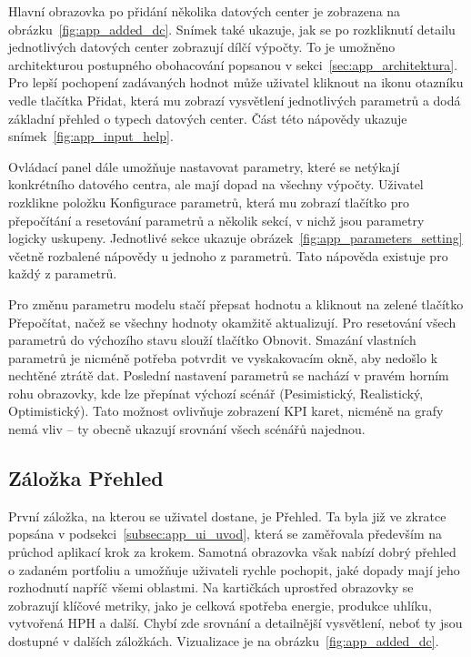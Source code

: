 Hlavní obrazovka po přidání několika datových center je zobrazena na obrázku~\ref{fig:app_added_dc}. Snímek také ukazuje, jak se po rozkliknutí detailu jednotlivých datových center zobrazují dílčí výpočty. To je umožněno architekturou postupného obohacování popsanou v sekci~\ref{sec:app_architektura}. Pro lepší pochopení zadávaných hodnot může uživatel kliknout na ikonu otazníku vedle tlačítka Přidat, která mu zobrazí vysvětlení jednotlivých parametrů a dodá základní přehled o typech datových center. Část této nápovědy ukazuje snímek~\ref{fig:app_input_help}.

Ovládací panel dále umožňuje nastavovat parametry, které se netýkají konkrétního datového centra, ale mají dopad na všechny výpočty. Uživatel rozklikne položku Konfigurace parametrů, která mu zobrazí tlačítko pro přepočítání a resetování parametrů a několik sekcí, v nichž jsou parametry logicky uskupeny. Jednotlivé sekce ukazuje obrázek~\ref{fig:app_parameters_setting} včetně rozbalené nápovědy u jednoho z parametrů. Tato nápověda existuje pro každý z parametrů.

Pro změnu parametru modelu stačí přepsat hodnotu a kliknout na zelené tlačítko Přepočítat, načež se všechny hodnoty okamžitě aktualizují. Pro resetování všech parametrů do výchozího stavu slouží tlačítko Obnovit. Smazání vlastních parametrů je nicméně potřeba potvrdit ve vyskakovacím okně, aby nedošlo k nechtěné ztrátě dat. Poslední nastavení parametrů se nachází v pravém horním rohu obrazovky, kde lze přepínat výchozí scénář (Pesimistický, Realistický, Optimistický). Tato možnost ovlivňuje zobrazení KPI karet, nicméně na grafy nemá vliv -- ty obecně ukazují srovnání všech scénářů najednou.

\subsection{Záložka Přehled}
\label{subsec:app_ui_prehled}

První záložka, na kterou se uživatel dostane, je Přehled. Ta byla již ve zkratce popsána v podsekci~\ref{subsec:app_ui_uvod}, která se zaměřovala především na průchod aplikací krok za krokem. Samotná obrazovka však nabízí dobrý přehled o zadaném portfoliu a umožňuje uživateli rychle pochopit, jaké dopady mají jeho rozhodnutí napříč všemi oblastmi. Na kartičkách uprostřed obrazovky se zobrazují klíčové metriky, jako je celková spotřeba energie, produkce uhlíku, vytvořená HPH a další. Chybí zde srovnání a detailnější vysvětlení, neboť ty jsou dostupné v dalších záložkách. Vizualizace je na obrázku~\ref{fig:app_added_dc}.

